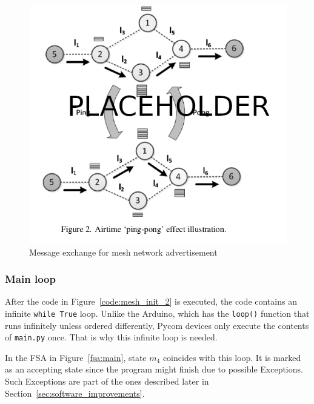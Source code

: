 				\begin{figure}[h]
					\centering
					\includegraphics[width=.7\textwidth]{resources/img/chap5/message_exchange}
					\caption{Message exchange for mesh network advertisement}
					\label{img:message_exchange}
				\end{figure}
	
			\subsubsection{Main loop}\label{subsec:loop}
	
				After the code in Figure~\ref{code:mesh_init_2} is executed, the code contains an infinite \texttt{while True} loop.
				Unlike the Arduino, which has the \texttt{loop()} function that runs infinitely unless ordered differently, Pycom devices only execute the contents of \texttt{main.py} once. 
				That is why this infinite loop is needed.
				
				In the FSA in Figure~\ref{fsa:main}, state $ m_{4} $ coincides with this loop.
				It is marked as an accepting state since the program might finish due to possible Exceptions.
				Such Exceptions are part of the ones described later in Section~\ref{sec:software_improvements}.
				
